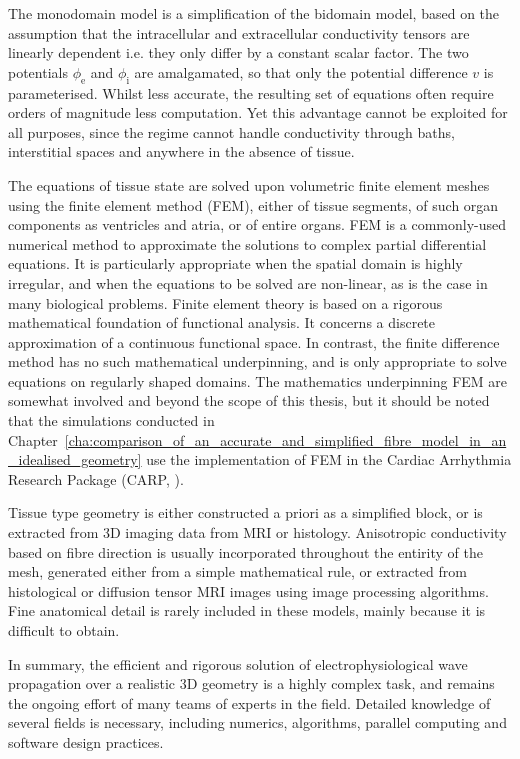   The monodomain model is a simplification of the bidomain model, based on the assumption that the intracellular and extracellular conductivity tensors are linearly dependent i.e. they only differ by a constant scalar factor. The two potentials $\phi_\text{e}$ and $\phi_\text{i}$ are amalgamated, so that only the potential difference $v$ is parameterised. Whilst less accurate, the resulting set of equations often require orders of magnitude less computation. Yet this advantage cannot be exploited for all purposes, since the regime cannot handle conductivity through baths, interstitial spaces and anywhere in the absence of tissue.
  
  The equations of tissue state are solved upon volumetric finite element meshes using the finite element method (FEM), either of tissue segments, of such organ components as ventricles and atria, or of entire organs. FEM is a commonly-used numerical method to approximate the solutions to complex partial differential equations. It is particularly appropriate when the spatial domain is highly irregular, and when the equations to be solved are non-linear, as is the case in many biological problems. Finite element theory is based on a rigorous mathematical foundation of functional analysis. It concerns a discrete approximation of a continuous functional space. In contrast, the finite difference method has no such mathematical underpinning, and is only appropriate to solve equations on regularly shaped domains. The mathematics underpinning FEM are somewhat involved and beyond the scope of this thesis, but it should be noted that the simulations conducted in Chapter~\ref{cha:comparison_of_an_accurate_and_simplified_fibre_model_in_an_idealised_geometry} use the implementation of FEM in the Cardiac Arrhythmia Research Package (CARP, \cite{Vigmond2003}).
  
  Tissue type geometry is either constructed a priori as a simplified block, or is extracted from 3D imaging data from MRI or histology. Anisotropic conductivity based on fibre direction is usually incorporated throughout the entirity of the mesh, generated either from a simple mathematical rule, or extracted from histological or diffusion tensor MRI images using image processing algorithms. Fine anatomical detail is rarely included in these models, mainly because it is difficult to obtain.
    
  In summary, the efficient and rigorous solution of electrophysiological wave propagation over a realistic 3D geometry is a highly complex task, and remains the ongoing effort of many teams of experts in the field. Detailed knowledge of several fields is necessary, including numerics, algorithms, parallel computing and software design practices.


